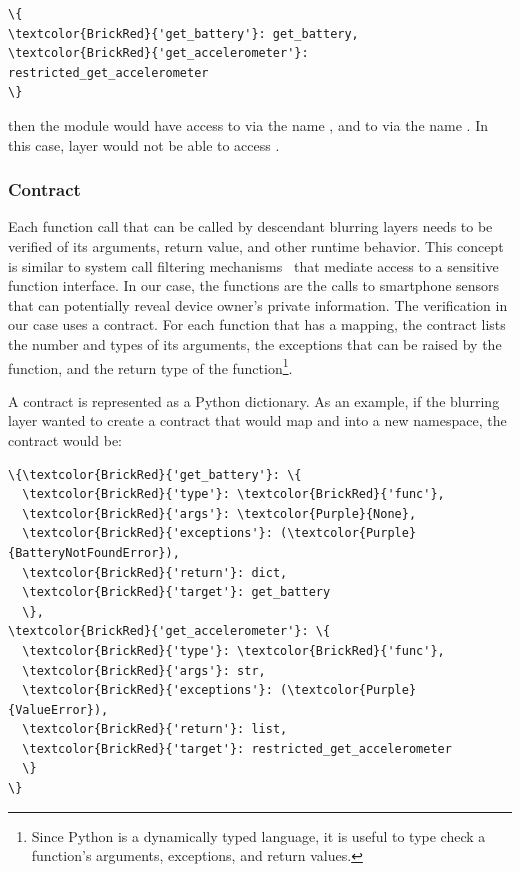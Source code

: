 \begin{Verbatim}
\{
\textcolor{BrickRed}{'get_battery'}: get_battery, 
\textcolor{BrickRed}{'get_accelerometer'}: restricted_get_accelerometer
\}
\end{Verbatim}
then the module  would have access
to  via the name , and to
 via the name 
. In this case, layer  would not 
be able to access .

\subsubsection{Contract}

%
Each function call that can be called by descendant blurring
layers needs to be verified of its arguments, return value, and 
other runtime behavior. This concept is similar to system call filtering
mechanisms~\cite{acharya2000mapbox, fraser2000hardening} 
that mediate access to a sensitive function interface. In our case, 
the functions are the calls to smartphone sensors that 
can potentially reveal device owner's private information. The 
verification in our case uses a contract. For each function that has a 
mapping, the contract lists the number 
and types of its arguments, the exceptions that can be raised 
by the function, and the return type of the function\footnote{\scriptsize 
Since Python is a dynamically typed language, it is useful to type check 
a function's arguments, exceptions, and return values.}.

A contract is represented as a Python dictionary. As an example, if 
the blurring layer  wanted to create a contract that would map
 and  into 
a new namespace, the contract would be: 

\begin{Verbatim}
\{\textcolor{BrickRed}{'get_battery'}: \{
  \textcolor{BrickRed}{'type'}: \textcolor{BrickRed}{'func'},
  \textcolor{BrickRed}{'args'}: \textcolor{Purple}{None}, 
  \textcolor{BrickRed}{'exceptions'}: (\textcolor{Purple}{BatteryNotFoundError}), 
  \textcolor{BrickRed}{'return'}: dict,
  \textcolor{BrickRed}{'target'}: get_battery
  \}, 
\textcolor{BrickRed}{'get_accelerometer'}: \{
  \textcolor{BrickRed}{'type'}: \textcolor{BrickRed}{'func'},
  \textcolor{BrickRed}{'args'}: str, 
  \textcolor{BrickRed}{'exceptions'}: (\textcolor{Purple}{ValueError}), 
  \textcolor{BrickRed}{'return'}: list,
  \textcolor{BrickRed}{'target'}: restricted_get_accelerometer
  \}
\}
\end{Verbatim} 

